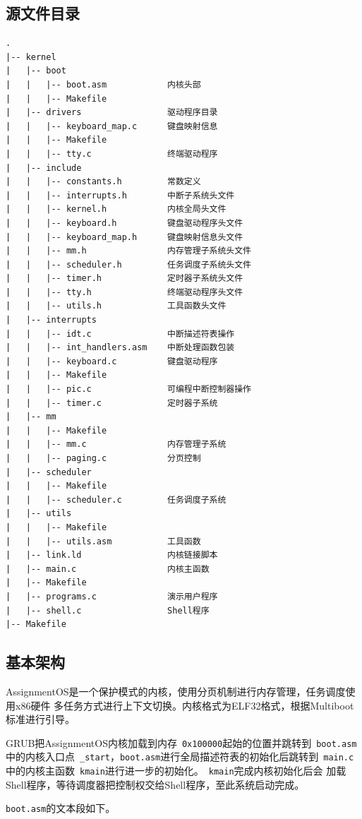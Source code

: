 \documentclass[a4paper, adobefonts]{ctexart}
\begin{document}
\subsection{源文件目录}
\begin{verbatim}
.
|-- kernel
|   |-- boot
|   |   |-- boot.asm            内核头部
|   |   |-- Makefile
|   |-- drivers                 驱动程序目录
|   |   |-- keyboard_map.c      键盘映射信息
|   |   |-- Makefile
|   |   |-- tty.c               终端驱动程序
|   |-- include
|   |   |-- constants.h         常数定义
|   |   |-- interrupts.h        中断子系统头文件
|   |   |-- kernel.h            内核全局头文件
|   |   |-- keyboard.h          键盘驱动程序头文件
|   |   |-- keyboard_map.h      键盘映射信息头文件
|   |   |-- mm.h                内存管理子系统头文件
|   |   |-- scheduler.h         任务调度子系统头文件
|   |   |-- timer.h             定时器子系统头文件
|   |   |-- tty.h               终端驱动程序头文件
|   |   |-- utils.h             工具函数头文件
|   |-- interrupts
|   |   |-- idt.c               中断描述符表操作
|   |   |-- int_handlers.asm    中断处理函数包装
|   |   |-- keyboard.c          键盘驱动程序
|   |   |-- Makefile
|   |   |-- pic.c               可编程中断控制器操作
|   |   |-- timer.c             定时器子系统
|   |-- mm
|   |   |-- Makefile
|   |   |-- mm.c                内存管理子系统
|   |   |-- paging.c            分页控制
|   |-- scheduler
|   |   |-- Makefile
|   |   |-- scheduler.c         任务调度子系统
|   |-- utils
|   |   |-- Makefile
|   |   |-- utils.asm           工具函数
|   |-- link.ld                 内核链接脚本
|   |-- main.c                  内核主函数
|   |-- Makefile
|   |-- programs.c              演示用户程序
|   |-- shell.c                 Shell程序
|-- Makefile
\end{verbatim}

\subsection{基本架构}
AssignmentOS是一个保护模式的内核，使用分页机制进行内存管理，任务调度使用x86硬件
多任务方式进行上下文切换。内核格式为ELF32格式，根据Multiboot标准进行引导。

GRUB把AssignmentOS内核加载到内存~\verb|0x100000|起始的位置并跳转到~\verb|boot.asm|
中的内核入口点~\verb|_start|，\verb|boot.asm|进行全局描述符表的初始化后跳转到~\verb|main.c|
中的内核主函数~\verb|kmain|进行进一步的初始化。~\verb|kmain|完成内核初始化后会
加载Shell程序，等待调度器把控制权交给Shell程序，至此系统启动完成。

\verb|boot.asm|的文本段如下。
\end{document}
